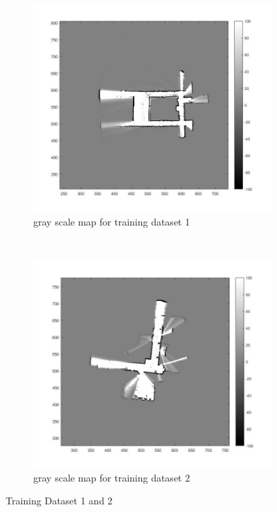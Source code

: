 \documentclass[fleqn,10pt]{SelfArx} %
\begin{document}
\begin{figure}
    \centering
    \begin{subfigure}[t]{0.5\textwidth}
        \centering
        \includegraphics[scale = 0.5]{set1_map.jpg}
        \caption{gray scale map for training dataset 1}
    \end{subfigure}%
    ~ 
    \begin{subfigure}[t]{0.5\textwidth}
        \centering
        \includegraphics[scale = 0.5]{set2_map.jpg}
        \caption{gray scale map for training dataset 2}
    \end{subfigure}
    \caption{Training Dataset 1 and 2}
    \label{fig:train12}
\end{figure}
\end{document}
